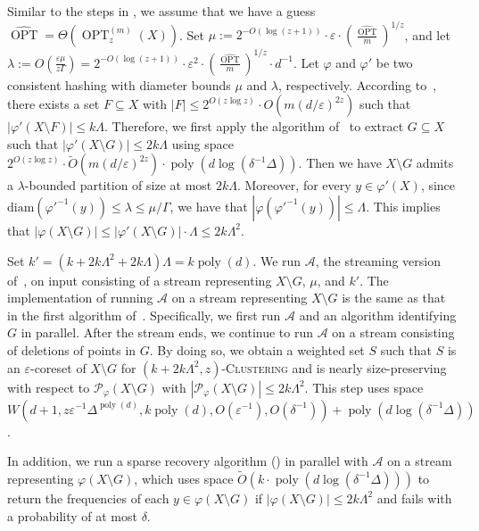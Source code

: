 \documentclass[letterpaper,11pt]{article}
\theoremstyle{plain}
\theoremstyle{definition}
\theoremstyle{remark}
\DeclareMathOperator{\poly}{poly}
\DeclareMathOperator{\OPT}{OPT}
\newcommand{\diam}{\mathrm{diam}}
\newcommand{\GOPT}{\widehat{\OPT}}
\newcommand{\eps}{\varepsilon}
\renewcommand{\phi}{\varphi}
\newcommand{\calA}{\mathcal{A}}
\newcommand{\calP}{\mathcal{P}}
\newcommand{\ProblemName}[1]{\textsc{#1}}
\newcommand{\tzC}[1]{\ProblemName{$(#1,z)$-Clustering}\xspace}
\begin{document}
Similar to the steps in , we assume that we have a guess $\GOPT = \Theta\left(\OPT_z^{(m)}(X)\right)$. Set $\mu:=2^{-O(\log(z+1))}\cdot \eps\cdot \left(\frac{\GOPT}{m} \right)^{1/z}$, and let $\lambda:= O(\frac{\eps\mu}{z\Gamma}) = 2^{-O(\log(z+1))}\cdot \eps^{2}\cdot \left(\frac{\GOPT}{m} \right)^{1/z}\cdot d^{-1}$. 
Let $\phi$ and $\phi'$ be two consistent hashing with diameter bounds $\mu$ and $\lambda$, respectively.
According to~, there exists a set $F\subseteq X$ with $|F|\le 2^{O(z\log z)}\cdot O(m(d/\eps)^{2z})$ such that $|\phi'(X\setminus F)|\le k\Lambda$. 
Therefore, we first apply the algorithm of~ to extract $G\subseteq X$ such that $|\phi'(X\setminus G)|\le 2k\Lambda$ using space $2^{O(z\log z)}\cdot\tilde O(m(d/\eps)^{2z})\cdot \poly(d\log(\delta^{-1}\Delta))$. 
Then we have $X\setminus G$ admits a $\lambda$-bounded partition of size at most $2k\Lambda$.
Moreover, for every $y\in \phi'(X)$, since $\diam(\phi'^{-1}(y))\le \lambda\le \mu/\Gamma$, we have that $|\phi(\phi'^{-1}(y))|\le \Lambda$.
This implies that $|\phi(X\setminus G)|\le |\phi'(X\setminus G)|\cdot \Lambda \le 2k\Lambda^2$.


Set $k' = (k + 2k\Lambda^2 + 2k\Lambda)\Lambda = k\poly(d)$. 
We run $\calA$, the streaming version of~, on input consisting of a stream representing $X\setminus G$, $\mu$, and $k'$.
The implementation of running $\calA$ on a stream representing $X\setminus G$ is the same as that in the first algorithm of~. Specifically, we first run $\calA$ and an algorithm identifying $G$ in parallel. After the stream ends, we continue to run $\calA$ on a stream consisting of deletions of points in $G$.
By doing so, we obtain a weighted set $S$ such that $S$ is an $\eps$-coreset of $X\setminus G$ for \tzC{k+2k\Lambda^2} and is nearly size-preserving with respect to $\calP_\phi(X\setminus G)$ with $|\calP_{\phi}(X\setminus G)|\le 2k\Lambda^2$. This step uses space $W(d+1,z\eps^{-1}\Delta^{\poly(d)},k\poly(d),O(\eps^{-1}),O(\delta^{-1})) + \poly(d\log(\delta^{-1}\Delta))$.


In addition, we run a sparse recovery algorithm () in parallel with $\calA$ on a stream representing $\phi(X\setminus G)$, which uses space $\tilde O(k\cdot \poly(d\log(\delta^{-1}\Delta)))$ to return the frequencies of each $y \in \phi(X\setminus G)$ if $|\phi(X\setminus G)| \leq 2k\Lambda^2$ and fails with a probability of at most $\delta$.
\end{document}
